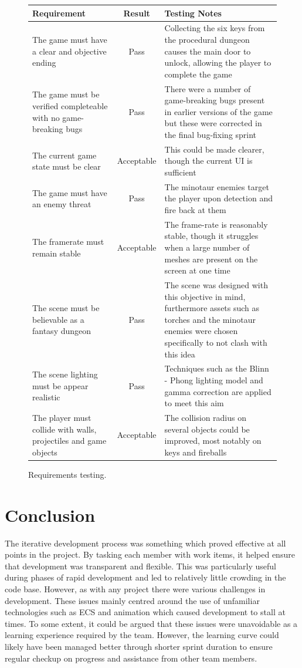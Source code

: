 \documentclass[a4paper, oneside, 11pt]{report}
\begin{document}
\begin{figure}[H]
	\centering
	\begin{tabular}{p{}||c||p{}}
		Requirement & Result & Testing Notes \\ 
		\hline 
		\hline 
		The game must have a clear and objective ending & Pass & Collecting the six keys from the procedural dungeon causes the main door to unlock, allowing the player to complete the game \\ \hline
		The game must be verified completeable with no game-breaking bugs & Pass &  There were a number of game-breaking bugs present in earlier versions of the game but these were corrected in the final bug-fixing sprint \\ \hline
		The current game state must be clear & Acceptable & This could be made clearer, though the current UI is sufficient \\ \hline
		The game must have an enemy threat & Pass & The minotaur enemies target the player upon detection and fire back at them \\ \hline
        The framerate must remain stable & Acceptable & The frame-rate is reasonably stable, though it struggles when a large number of meshes are present on the screen at one time \\ \hline
        The scene must be believable as a fantasy dungeon & Pass & The scene was designed with this objective in mind, furthermore assets such as torches and the minotaur enemies were chosen specifically to not clash with this idea \\ \hline
        The scene lighting must be appear realistic & Pass & Techniques such as the Blinn - Phong lighting model and gamma correction are applied to meet this aim \\ \hline
         The player must collide with walls, projectiles and game objects & Acceptable &  The collision radius on several objects could be improved, most notably on keys and fireballs \\ \hline
	\end{tabular}
	\caption{Requirements testing. \label{requirements-test}}
\end{figure}

\chapter{Conclusion}
The iterative development process was something which proved effective at all points in the project. By tasking each member with work items, it helped ensure that development was transparent and flexible. This was particularly useful during phases of rapid development and led to relatively little crowding in the code base. However, as with any project there were various challenges in development. These issues mainly centred around the use of unfamiliar technologies such as ECS and animation which caused development to stall at times. To some extent, it could be argued that these issues were unavoidable as a learning experience required by the team. However, the learning curve could likely have been managed better through shorter sprint duration to ensure regular checkup on progress and assistance from other team members.
\end{document}
